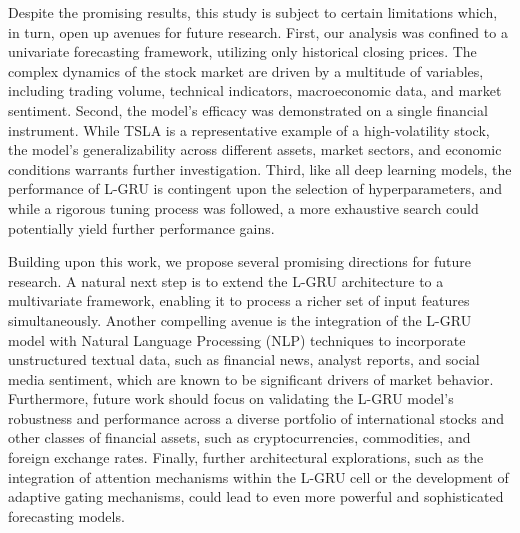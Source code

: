 \documentclass{cys}
\begin{document}
Despite the promising results, this study is subject to certain limitations which, in turn, open up avenues for future research. First, our analysis was confined to a univariate forecasting framework, utilizing only historical closing prices. The complex dynamics of the stock market are driven by a multitude of variables, including trading volume, technical indicators, macroeconomic data, and market sentiment. Second, the model's efficacy was demonstrated on a single financial instrument. While TSLA is a representative example of a high-volatility stock, the model's generalizability across different assets, market sectors, and economic conditions warrants further investigation. Third, like all deep learning models, the performance of L-GRU is contingent upon the selection of hyperparameters, and while a rigorous tuning process was followed, a more exhaustive search could potentially yield further performance gains.

Building upon this work, we propose several promising directions for future research. A natural next step is to extend the L-GRU architecture to a multivariate framework, enabling it to process a richer set of input features simultaneously. Another compelling avenue is the integration of the L-GRU model with Natural Language Processing (NLP) techniques to incorporate unstructured textual data, such as financial news, analyst reports, and social media sentiment, which are known to be significant drivers of market behavior. Furthermore, future work should focus on validating the L-GRU model's robustness and performance across a diverse portfolio of international stocks and other classes of financial assets, such as cryptocurrencies, commodities, and foreign exchange rates. Finally, further architectural explorations, such as the integration of attention mechanisms within the L-GRU cell or the development of adaptive gating mechanisms, could lead to even more powerful and sophisticated forecasting models.



\vspace{12pt}


\end{document}

